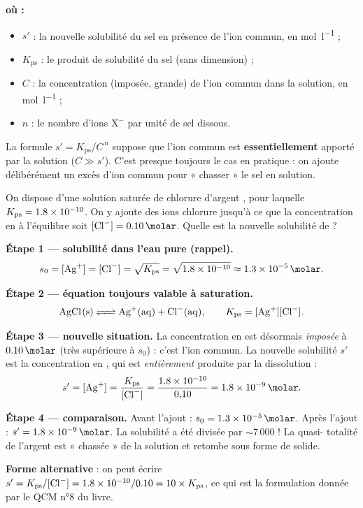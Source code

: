 \documentclass[11pt,a4paper]{article}
\newenvironment{ou}{%
  \par\smallskip\noindent\textbf{où :}\nopagebreak
  \begin{itemize}[leftmargin=1.8em,topsep=2pt,itemsep=1.5pt,parsep=0pt]}%
  {\end{itemize}}
\newcommand{\Kps}{K_{\mathrm{ps}}}
\begin{document}
\begin{ou}
  \item $s'$ : la nouvelle solubilité du sel en présence de l'ion commun, en \si{\mole\per\litre} ;
  \item $\Kps$ : le produit de solubilité du sel (sans dimension) ;
  \item $C$ : la concentration (imposée, grande) de l'ion commun dans la solution, en \si{\mole\per\litre} ;
  \item $n$ : le nombre d'ions $\mathrm{X}^{-}$ par unité de sel dissous.
\end{ou}

\begin{remarque}
La formule $s'=\Kps/C^{\,n}$ suppose que l'ion commun est \textbf{essentiellement} apporté par la
solution ($C\gg s'$). C'est presque toujours le cas en pratique : on ajoute délibérément un excès
d'ion commun pour « chasser » le sel en solution.
\end{remarque}

\begin{exemple}
On dispose d'une solution saturée de chlorure d'argent , pour laquelle
$\Kps=\num{1{,}8e-10}$. On y ajoute des ions chlorure jusqu'à ce que la concentration en  à
l'équilibre soit $[\ce{Cl-}]=\qty{0{,}10}{\molar}$. Quelle est la nouvelle solubilité de  ?

\smallskip
\textbf{Étape 1 — solubilité dans l'eau pure (rappel).}
\[ s_{0} = [\ce{Ag+}] = [\ce{Cl-}] = \sqrt{\Kps} = \sqrt{\num{1{,}8e-10}}
        \approx \qty{1{,}3e-5}{\molar}. \]

\textbf{Étape 2 — équation toujours valable à saturation.}
\[ \ce{AgCl(s) <=> Ag^{+}(aq) + Cl^{-}(aq)},\qquad \Kps=[\ce{Ag+}][\ce{Cl-}]. \]

\textbf{Étape 3 — nouvelle situation.} La concentration en  est désormais \emph{imposée} à
$\qty{0{,}10}{\molar}$ (très supérieure à $s_{0}$) : c'est l'ion commun. La nouvelle solubilité $s'$
est la concentration en , qui est \emph{entièrement} produite par la dissolution :
\[ s' = [\ce{Ag+}] = \dfrac{\Kps}{[\ce{Cl-}]}
     = \dfrac{\num{1{,}8e-10}}{0{,}10}
     = \qty{1{,}8e-9}{\molar}. \]

\textbf{Étape 4 — comparaison.} Avant l'ajout : $s_{0}=\qty{1{,}3e-5}{\molar}$.
Après l'ajout : $s'=\qty{1{,}8e-9}{\molar}$. La solubilité a été divisée par $\sim 7\,000$ ! La quasi-
totalité de l'argent est « chassée » de la solution et retombe sous forme de  solide.

\textbf{Forme alternative} : on peut écrire
$s' = \Kps / [\ce{Cl-}] = \num{1{,}8e-10}/\num{0{,}10} = 10\times\Kps$, ce qui est la formulation
donnée par le QCM n°8 du livre.
\end{exemple}
\end{document}
